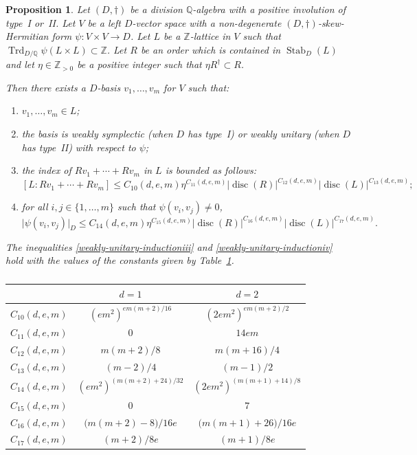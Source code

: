 \documentclass[JEP,XML,SOM,Unicode,NoFloatCountersInSection]{cedram}
\newenvironment{enumeratei}
{\bgroup\def\theenumi{\roman{enumi}}\def\theenumii{\alph{enumii}}\begin{enumerate}}
{\end{enumerate}\egroup}
\newcommand{\bQ}{\mathbb{Q}}
\newcommand{\bZ}{\mathbb{Z}}
\DeclareMathOperator{\disc}{disc}
\DeclareMathOperator{\Stab}{Stab}
\DeclareMathOperator{\Trd}{Trd}
\newcommand{\abs}[1]{\lvert #1 \rvert}
\newtheorem{proposition}[lemma]{Proposition}
\begin{document}
\begin{proposition} \label{weakly-unitary-induction}
Let $(D,\dag)$ be a division $\bQ$-algebra with a positive involution of type~I or~II.
Let $V$ be a left $D$-vector space with a non-degenerate $(D,\dag)$-skew-Hermitian form $\psi \colon V \!\times\! V \!\to\! D$.
Let $L$ be a $\bZ$-lattice in $V$ such that \hbox{$\Trd_{D/\bQ} \psi(L \!\times\! L) \!\subset\! \bZ$}.
Let $R$ be an order which is contained in $\Stab_D(L)$ and let $\eta \in \bZ_{>0}$ be a positive integer such that $\eta R^\dag \subset R$.

Then there exists a $D$-basis $v_1, \dotsc, v_m$ for $V$ such that:
\begin{enumeratei}
\item\label{weakly-unitary-inductioni} $v_1, \dotsc, v_m \in L$;
\item\label{weakly-unitary-inductionii} the basis is weakly symplectic (when $D$ has type~I) or weakly unitary (when $D$ has type~II) with respect to $\psi$;
\item\label{weakly-unitary-inductioniii} the index of $Rv_1 + \dotsb + Rv_m$ in $L$ is bounded as follows:
\[
[L : Rv_1 + \dotsb + Rv_m] \leq C_{10}(d,e,m) \eta^{C_{11}(d,e,m)} \abs{\disc(R)}^{C_{12}(d,e,m)} \abs{\disc(L)}^{C_{13}(d,e,m)};
\]
\item\label{weakly-unitary-inductioniv} for all $i, j \in \{ 1, \dotsc, m \}$ such that $\psi(v_i, v_j) \neq 0$,
\[
\abs{\psi(v_i, v_j)}_D \leq C_{14}(d, e, m) \eta^{C_{15}(d,e,m)} \abs{\disc(R)}^{C_{16}(d,e,m)} \abs{\disc(L)}^{C_{17}(d,e,m)}.
\]
\end{enumeratei}

The inequalities \eqref{weakly-unitary-inductioniii} and \eqref{weakly-unitary-inductioniv} hold with the values of the constants given by Table~\ref{Table:1}.
\begin{table}
\caption{\label{Table:1}}
\begin{center}
\bgroup
\renewcommand{\arraystretch}{1.4}
\begin{tabular}{|c|c|c|}
\hline
& $d=1$
& $d=2$
\\ \hline
$C_{10}(d,e,m)$
& $(em^2)^{em(m+2)/16}$
& $(2em^2)^{em(m+2)/2}$
\\ $C_{11}(d,e,m)$
& $0$
& $14em$
\\ $C_{12}(d,e,m)$
& $m(m+2)/8$
& $m(m+16)/4$
\\ $C_{13}(d,e,m)$
& $(m-2)/4$
& $(m-1)/2$
\\ $C_{14}(d,e,m)$
& $(em^2)^{(m(m+2)+24)/32}$
& $(2em^2)^{(m(m+1)+14)/8}$
\\ $C_{15}(d,e,m)$
& $0$
& $7$
\\ $C_{16}(d,e,m)$
& $\bigl( m(m+2)-8 \bigr)/16e$
& $\bigl( m(m+1)+26 \bigr)/16e$
\\ $C_{17}(d,e,m)$
& $(m+2)/8e$
& $(m+1)/8e$\\
\hline
\end{tabular}
\egroup
\end{center}
\vspace*{-\baselineskip}
\end{table}
\end{proposition}
\end{document}
